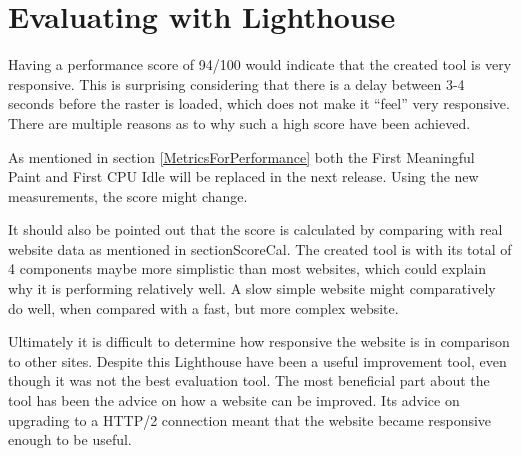 \section{Evaluating with Lighthouse}\label{EvaLighthouse}

Having a performance score of 94/100 would indicate that the created tool is very responsive. This is surprising considering that there is a delay between 3-4 seconds before the raster is loaded, which does not make it “feel” very responsive. There are multiple reasons as to why such a high score have been achieved.

As mentioned in section \ref{MetricsForPerformance} both the First Meaningful Paint and First CPU Idle will be replaced in the next release. Using the new measurements, the score might change.

It should also be pointed out that the score is calculated by comparing with real website data as mentioned in section{ScoreCal}. The created tool is with its total of 4 components maybe more simplistic than most websites, which could explain why it is performing relatively well. A slow simple website might comparatively do well, when compared with a fast, but more complex website.

Ultimately it is difficult to determine how responsive the website is in comparison to other sites. Despite this Lighthouse have been a useful improvement tool, even though it was not the best evaluation tool. The most beneficial part about the tool has been the advice on how a website can be improved. Its advice on upgrading to a HTTP/2 connection meant that the website became responsive enough to be useful. 

%

